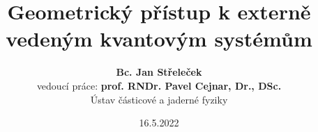 \documentclass{beamer}
\begin{document}
\title{Geometrický přístup k externě vedeným kvantovým systémům}   
\author{\textbf{Bc. Jan Střeleček} \\ vedoucí práce: \textbf{prof. RNDr. Pavel Cejnar, Dr., DSc.}\\ Ústav částicové a jaderné fyziky}
\date{16.5.2022} 

\frame{\titlepage} 


\end{document}
